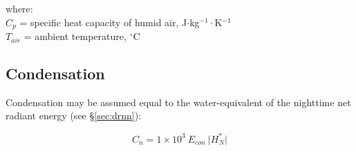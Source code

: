 \noindent where: \\ 
\indent $C_p$ = specific heat capacity of humid air, J$\cdot$kg$^{-1}\cdot$K$^{-1}$\\
\indent $T_{air}$ = ambient temperature, $^{\circ}$C\\

\subsection{Condensation}
\label{sec:cond}
Condensation may be assumed equal to the water-equivalent of the nighttime net radiant energy (see \S \ref{sec:drnn}):

\begin{equation}
\label{eq:cond}
	C_n = 1\times 10^3\: E_{con}\: \lvert H_N^{\ast} \rvert
\end{equation}

